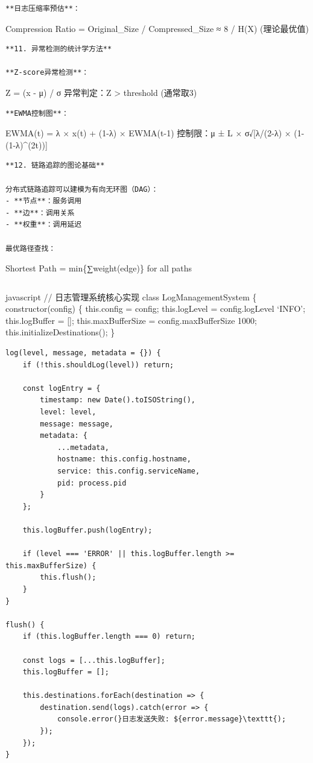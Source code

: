 \begin{lstlisting}
**日志压缩率预估**：
\end{lstlisting}

Compression Ratio = Original\_Size / Compressed\_Size ≈ 8 / H(X) (理论最优值)

\begin{lstlisting}
**11. 异常检测的统计学方法**

**Z-score异常检测**：
\end{lstlisting}

Z = (x - μ) / σ 异常判定：\textbar Z\textbar{} \textgreater{} threshold (通常取3)

\begin{lstlisting}
**EWMA控制图**：
\end{lstlisting}

EWMA(t) = λ × x(t) + (1-λ) × EWMA(t-1) 控制限：μ ± L × σ√{[}λ/(2-λ) × (1-(1-λ)\^{}(2t)){]}

\begin{lstlisting}
**12. 链路追踪的图论基础**

分布式链路追踪可以建模为有向无环图（DAG）：
- **节点**：服务调用
- **边**：调用关系
- **权重**：调用延迟

最优路径查找：
\end{lstlisting}

Shortest Path = min\{∑weight(edge)\} for all paths

\begin{lstlisting}

\end{lstlisting}

javascript // 日志管理系统核心实现 class LogManagementSystem \{ constructor(config) \{ this.config = config; this.logLevel = config.logLevel \textbar\textbar{} `INFO'; this.logBuffer = {[}{]}; this.maxBufferSize = config.maxBufferSize \textbar\textbar{} 1000; this.initializeDestinations(); \}

\begin{verbatim}
log(level, message, metadata = {}) {
    if (!this.shouldLog(level)) return;
    
    const logEntry = {
        timestamp: new Date().toISOString(),
        level: level,
        message: message,
        metadata: {
            ...metadata,
            hostname: this.config.hostname,
            service: this.config.serviceName,
            pid: process.pid
        }
    };
    
    this.logBuffer.push(logEntry);
    
    if (level === 'ERROR' || this.logBuffer.length >= this.maxBufferSize) {
        this.flush();
    }
}

flush() {
    if (this.logBuffer.length === 0) return;
    
    const logs = [...this.logBuffer];
    this.logBuffer = [];
    
    this.destinations.forEach(destination => {
        destination.send(logs).catch(error => {
            console.error(}日志发送失败: ${error.message}\texttt{);
        });
    });
}
\end{verbatim}

